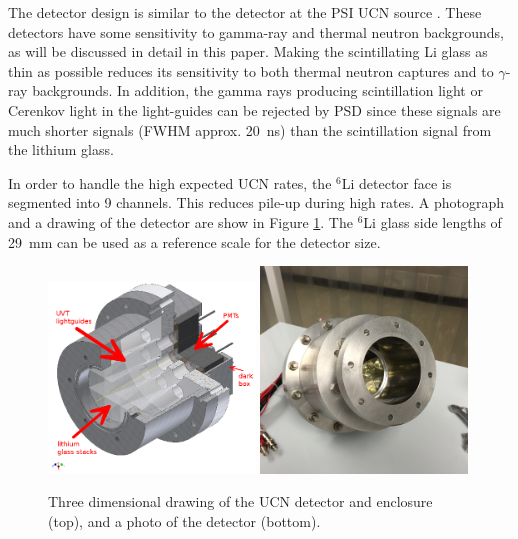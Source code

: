 \documentclass[review]{elsarticle}
\begin{document}
The detector design is similar to the detector at the PSI UCN source
\cite{ban}.  These detectors have some sensitivity to gamma-ray and
thermal neutron backgrounds, as will be discussed in detail in this
paper.  Making the scintillating Li glass as thin as possible reduces
its sensitivity to both thermal neutron captures and to $\gamma$-ray
backgrounds.  In addition, the gamma rays producing scintillation
light or Cerenkov light in the light-guides can be rejected by PSD
since these signals are much shorter signals (FWHM approx. 20~ns) than
the scintillation signal from the lithium glass.

In order to handle the high expected UCN rates, the $^6$Li detector
face is segmented into 9 channels.  This reduces pile-up during high
rates.  A photograph and a drawing of the detector are show in Figure
\ref{fig:detdesigned}.  The ${^6}$Li glass side lengths of 29~mm can
be used as a reference scale for the detector size.

\begin{figure}[!htpb] 
\includegraphics[width=0.49\textwidth]{figures/detdesigned.png} 
\includegraphics[width=0.49\textwidth]{figures/ucndet.png} 
\caption{\label{fig:detdesigned} Three dimensional drawing of the UCN
  detector and enclosure (top), and a photo of the detector (bottom).}
\end{figure} 
\end{document}
